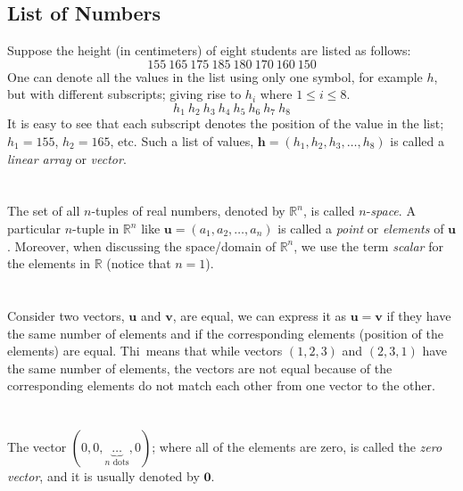 \documentclass[../setup.tex]{subfiles}
\begin{document}
\subsection{List of Numbers}
Suppose the height (in centimeters) of eight students are listed as follows:
\[155 \ 165 \ 175 \ 185 \ 180 \ 170 \ 160 \ 150\]
One can denote all the values in the list using only one symbol, for example $h$, but with different subscripts; giving rise to $h_i$ where $1 \leq i \leq 8$. 
\[h_1 \ h_2 \ h_3 \ h_4 \ h_5 \ h_6 \ h_7 \ h_8\]
It is easy to see that each subscript denotes the position of the value in the list; $h_1 = 155$, $h_2 = 165$, etc. Such a list of values, $\bm{h} = (h_1, h_2, h_3, \dots, h_8)$ is called a \textit{linear array} or \textit{vector}. \\
\phantom \\ \\
The set of all $n$-tuples of real numbers, denoted by $\mathbb{R}^n$, is called $n$-\textit{space}. A particular $n$-tuple in $\mathbb{R}^n$ like $\bm{u} = (a_1, a_2, \dots, a_n)$ is called a \textit{point} or \textit{elements} of $\bm{u}$. Moreover, when discussing the space/domain of $\mathbb{R}^n$, we use the term \textit{scalar} for the elements in $\mathbb{R}$ (notice that $n = 1$). \\
\phantom \\ \\
Consider two vectors, $\bm{u}$ and $\bm{v}$, are equal, we can express it as $\bm{u} = \bm{v}$ if they have the same number of elements and if the corresponding elements (position of the elements) are equal. Thi\ means that while vectors $(1, 2, 3)$ and $(2, 3, 1)$ have the same number of elements, the vectors are not equal because of the corresponding elements do not match each other from one vector to the other. \\
\phantom \\ \\
The vector $(0, 0, \underbrace{\dots}_{n \text{ dots}}, 0)$; where all of the elements are zero, is called the \textit{zero vector}, and it is usually denoted by $\boldsymbol{0}$. 
\end{document}
